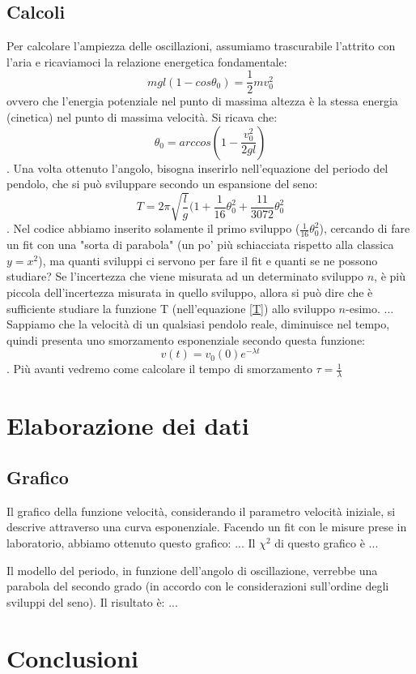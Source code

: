 \documentclass{article}
\begin{document}
    \subsection{Calcoli}
    Per calcolare l'ampiezza delle oscillazioni, assumiamo trascurabile l'attrito con l'aria e ricaviamoci la relazione energetica fondamentale:
    \begin{equation}
        mgl(1-cos\theta_0) = \frac{1}{2}m v_0^2
    \end{equation}
    ovvero che l'energia potenziale nel punto di massima altezza è la stessa energia (cinetica) nel punto di massima velocità. Si ricava che:
    \begin{equation}
        \theta_0 = arccos(1 -\frac{v_0^2}{2gl})
    \end{equation}.
    Una volta ottenuto l'angolo, bisogna inserirlo nell'equazione del periodo del pendolo, che si può sviluppare secondo un espansione del seno:
    \begin{equation}\label{T}
        T = 2 \pi \sqrt{\frac{l}{g}}(1 + \frac{1}{16}\theta_0^2 + \frac{11}{3072}\theta_0^2
    \end{equation}.
    Nel codice abbiamo inserito solamente il primo sviluppo ($\frac{1}{16}\theta_0^2$), cercando di fare un fit con una "sorta di parabola" (un po' più schiacciata rispetto alla classica $y=x^2$), ma quanti sviluppi ci servono per fare il fit e quanti se ne possono studiare? Se l'incertezza che viene misurata ad un determinato sviluppo $n$, è più piccola dell'incertezza misurata in quello sviluppo, allora si può dire che è sufficiente studiare la funzione T (nell'equazione \ref{T}) allo sviluppo $n$-esimo.
    ...
    Sappiamo che la velocità di un qualsiasi pendolo reale, diminuisce nel tempo, quindi presenta uno smorzamento esponenziale secondo questa funzione:
    \begin{equation}
        v(t) = v_0(0) e^{-\lambda t}
    \end{equation}.
    Più avanti vedremo come calcolare il tempo di smorzamento $\tau = \frac{1}{\lambda}$
    
\section{Elaborazione dei dati}
    
    \subsection{Grafico}
    Il grafico della funzione velocità, considerando il parametro velocità iniziale, si descrive attraverso una curva esponenziale. Facendo un fit con le misure prese in laboratorio, abbiamo ottenuto questo grafico:
    ...
    Il $\chi^2$ di questo grafico è ...
    
    Il modello del periodo, in funzione dell'angolo di oscillazione, verrebbe una parabola del secondo grado (in accordo con le considerazioni sull'ordine degli sviluppi del seno). Il risultato è:
    ...
    
\section{Conclusioni}
\end{document}
